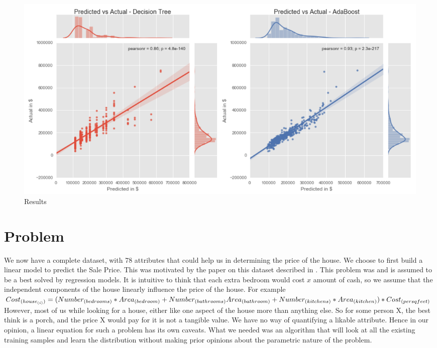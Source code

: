 \documentclass[fleqn,10pt]{SelfArx} %
\begin{document}
	\begin{figure}[ht]\centering %
		\includegraphics[width=\linewidth]{results}
		\caption{Results}
		\label{results}
	\end{figure}
	
	\section{Problem}
	We now have a complete dataset, with 78 attributes that could help us in determining the price of the house. We choose to first build a linear model to predict the Sale Price. This was motivated by the paper on this dataset described in \cite{dataset}. This problem was and is assumed to be a best solved by regression models. It is intuitive to think that each extra bedroom would cost $x$ amount of cash, so we assume that the independent components of the house linearly influence the price of the house. For example \\
	$Cost_{(house_{(i)})} \\
	= (Number_{(bedrooms)} * Area_{(bedroom)}+Number_{(bathrooms)}\\*Area_{(bathroom)}+Number_{(kitchens)}*Area_{(kitchen)})* Cost_{(persqfeet)}$\\
	
	However, most of us while looking for a house, either like one aspect of the house more than anything else. So for some person X, the best think is a porch, and the price X would pay for it is not a tangible value. We have no way of quantifying a likable attribute. Hence in our opinion, a linear equation for such a problem has its own caveats. What we needed was an algorithm that will look at all the existing training samples and learn the distribution without making prior opinions about the parametric nature of the problem.\\
	
\end{document}
